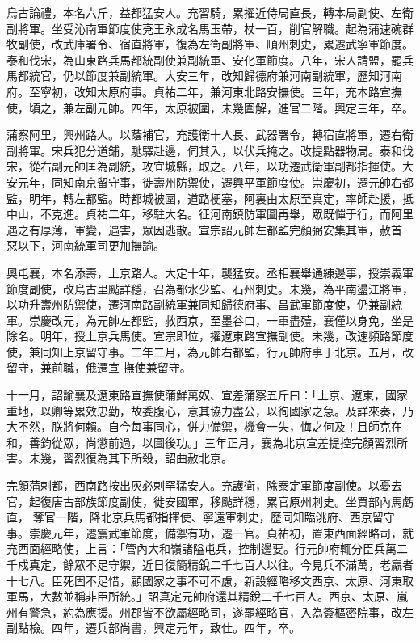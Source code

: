 \begin{pinyinscope}
 烏古論禮，本名六斤，益都猛安人。充習騎，累擢近侍局直長，轉本局副使、左衛副將軍。坐受沁南軍節度使兗王永成名馬玉帶，杖一百，削官解職。起為蒲速碗群牧副使，改武庫署令、宿直將軍，復為左衛副將軍、順州刺史，累遷武寧軍節度。泰和伐宋，為山東路兵馬都統副使兼副統軍、安化軍節度。八年，宋人請盟，罷兵馬都統官，仍以節度兼副統軍。大安三年，改知歸德府兼河南副統軍，歷知河南府。至寧初，改知太原府事。貞祐二年，兼河東北路安撫使。三年，充本路宣撫使，頃之，兼左副元帥。四年，太原被圍，未幾圍解，進官二階。興定三年，卒。



 蒲察阿里，興州路人。以蔭補官，充護衛十人長、武器署令，轉宿直將軍，遷右衛副將軍。宋兵犯分道鋪，馳驛赴邊，伺其入，以伏兵掩之。改提點器物局。泰和伐宋，從右副元帥匡為副統，攻宜城縣，取之。八年，以功遷武衛軍副都指揮使。大安元年，同知南京留守事，徙壽州防禦使，遷興平軍節度使。崇慶初，遷元帥右都監，明年，轉左都監。時都城被圍，道路梗塞，阿裏由太原至真定，率師赴援，抵中山，不克進。貞祐二年，移駐大名。征河南鎮防軍圖再舉，眾既憚于行，而阿里遇之有厚薄，軍變，遇害，眾因逃散。宣宗詔元帥左都監完顏弼安集其軍，赦首
 惡以下，河南統軍司更加撫諭。



 奧屯襄，本名添壽，上京路人。大定十年，襲猛安。丞相襄舉通練邊事，授崇義軍節度副使，改烏古里颭詳穩，召為都水少監、石州刺史。未幾，為平南盪江將軍，以功升壽州防禦使，遷河南路副統軍兼同知歸德府事、昌武軍節度使，仍兼副統軍。崇慶改元，為元帥左都監，救西京，至墨谷口，一軍盡殪，襄僅以身免，坐是除名。明年，授上京兵馬使。宣宗即位，擢遼東路宣撫副使。未幾，改速頻路節度使，兼同知上京留守事。二年二月，為元帥右都監，行元帥府事于北京。五月，改留守，兼前職，俄遷宣
 撫使兼留守。



 十一月，詔諭襄及遼東路宣撫使蒲鮮萬奴、宣差蒲察五斤曰：「上京、遼東，國家重地，以卿等累效忠勤，故委腹心，意其協力盡公，以徇國家之急。及詳來奏，乃大不然，朕將何賴。自今每事同心，併力備禦，機會一失，悔之何及！且師克在和，善鈞從眾，尚懲前過，以圖後功。」三年正月，襄為北京宣差提控完顏習烈所害。未幾，習烈復為其下所殺，詔曲赦北京。



 完顏蒲剌都，西南路按出灰必剌罕猛安人。充護衛，除泰定軍節度副使。以憂去官，起復唐古部族節度副使，徙安國軍，移颭詳穩，累官原州刺史。坐買部內馬虧直，
 奪官一階，降北京兵馬都指揮使、寧遠軍刺史，歷同知臨洮府、西京留守事。崇慶元年，遷震武軍節度，備禦有功，遷一官。貞祐初，置東西面經略司，就充西面經略使，上言：「管內大和嶺諸隘屯兵，控制邊要。行元帥府輒分臣兵萬二千戍真定，餘眾不足守禦，近日復簡精銳二千七百人以往。今見兵不滿萬，老羸者十七八。臣死固不足惜，顧國家之事不可不慮，新設經略移文西京、太原、河東取軍馬，大數並稱非臣所統。」詔真定元帥府還其精銳二千七百人。西京、太原、嵐州有警急，約為應援。州郡皆不欲屬經略司，遂罷經略官，入為簽樞密院事，改左
 副點檢。四年，遷兵部尚書，興定元年，致仕。四年，卒。




\end{pinyinscope}
